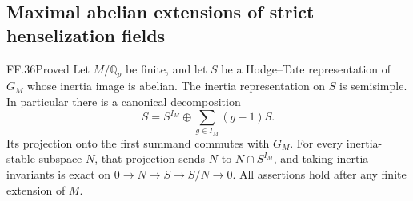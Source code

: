 \subsection{Maximal abelian extensions of strict henselization fields}

\begin{claim}{FF.36}{Proved}\label{clm:FFabelianHT}
Let \(M/\mathbb Q_p\) be finite, and let \(S\)
be a Hodge--Tate representation of \(G_M\) whose
inertia image is abelian. The inertia representation
on \(S\) is semisimple. In particular there is a
canonical decomposition
\[
 S=S^{I_M}\oplus
       \sum_{g\in I_M}(g-1)S.                         \tag{FF.36.1}
\]
Its projection onto the first summand commutes
with \(G_M\). For every inertia-stable subspace
\(N\), that projection sends \(N\) to
\(N\cap S^{I_M}\), and taking inertia invariants
is exact on \(0\to N\to S\to S/N\to0\).
All assertions hold after any finite extension
of \(M\).
\end{claim}
